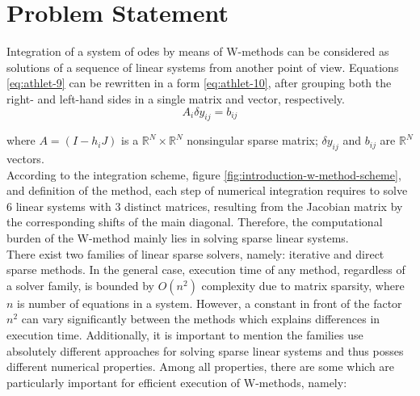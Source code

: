\chapter{Problem Statement}\label{chapter:problem-statment}


Integration of a system of \acrshort{ode}s by means of W-methods can be considered as solutions of a sequence of linear systems from another point of view. Equations \ref{eq:athlet-9} can be rewritten in a form \ref{eq:athlet-10}, after grouping both the right- and left-hand sides in a single matrix and vector, respectively.\\



\begin{equation} \label{eq:athlet-10}
	A_{i} \delta y_{ij} =  b_{ij} 
\end{equation}


where $A = (I - h_{i}J)$  is a $\mathbb{R}^{N} \times \mathbb{R}^{N}$ nonsingular sparse matrix; $\delta y_{ij}$  and $b_{ij}$ are $\mathbb{R}^{N}$ vectors.\\


According to the integration scheme, figure \ref{fig:introduction-w-method-scheme}, and definition of the method, each step of numerical integration requires to solve 6 linear systems with 3 distinct matrices, resulting from the Jacobian matrix by the corresponding shifts of the main diagonal. Therefore, the computational burden of the W-method mainly lies in solving sparse linear systems.\\


There exist two families of linear sparse solvers, namely: iterative and direct sparse methods. In the general case, execution time of any method, regardless of a solver family, is bounded by $O(n^2)$ complexity due to matrix sparsity, where $n$ is number of equations in a system. However, a constant in front of the factor $n^2$ can vary significantly between the methods which explains differences in execution time. Additionally, it is important to mention the families use absolutely different approaches for solving sparse linear systems and thus posses different numerical properties. Among all  properties, there are some which are particularly important for efficient execution of W-methods, namely: \\


